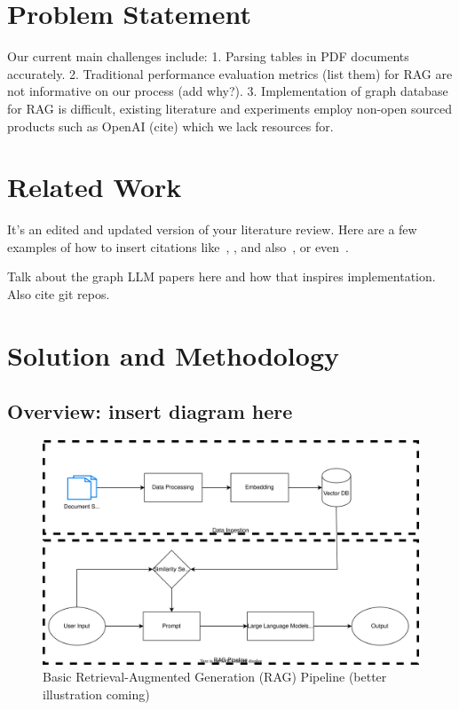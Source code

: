 \documentclass{scrartcl}
\begin{document}
\section{Problem Statement}
Our current main challenges include:
1. Parsing tables in PDF documents accurately.
2. Traditional performance evaluation metrics (list them) for RAG are not informative on our process (add why?). 
3. Implementation of graph database for RAG is difficult, existing literature and experiments employ non-open sourced products such as OpenAI (cite) which we lack resources for.


\section{Related Work}


It's an edited and updated version of your literature review. Here are a few examples of how to insert citations like~\cite{byzantine-pki}, \cite{atomic-mcast-tcs01}, and also~\cite{sybilattack}, or even~\cite{psn-fail, verisign-fail}.

Talk about the graph LLM papers here and how that inspires implementation. Also cite git repos.

\section{Solution and Methodology}
\subsection{Overview: insert diagram here}

\begin{figure}[H]
	\begin{center}
		\includegraphics[scale=0.7]{basic_RAG_pipeline.drawio.svg}
	\end{center}
	\caption{Basic Retrieval-Augmented Generation (RAG) Pipeline (better illustration coming)}
	\label{fig:ascent}
\end{figure}
\end{document}
